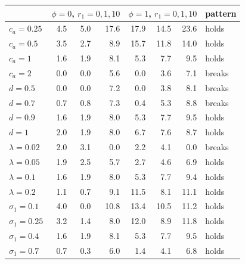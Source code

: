 \begin{tabular}{lrrrrrrl}
\toprule
& \multicolumn{3}{c}{$\phi=0$, $r_1=0,1,10$} & \multicolumn{3}{c}{$\phi=1$, $r_1=0,1,10$} & pattern \\
\midrule
$c_a=0.25$ & 4.5 & 5.0 & 17.6 & 17.9 & 14.5 & 23.6 & holds \\
$c_a=0.5$ & 3.5 & 2.7 & 8.9 & 15.7 & 11.8 & 14.0 & holds \\
$c_a=1$ & 1.6 & 1.9 & 8.1 & 5.3 & 7.7 & 9.5 & holds \\
$c_a=2$ & 0.0 & 0.0 & 5.6 & 0.0 & 3.6 & 7.1 & breaks \\
$d=0.5$ & 0.0 & 0.0 & 7.2 & 0.0 & 3.8 & 8.1 & breaks \\
$d=0.7$ & 0.7 & 0.8 & 7.3 & 0.4 & 5.3 & 8.8 & breaks \\
$d=0.9$ & 1.6 & 1.9 & 8.0 & 5.3 & 7.7 & 9.5 & holds \\
$d=1$ & 2.0 & 1.9 & 8.0 & 6.7 & 7.6 & 8.7 & holds \\
$\lambda=0.02$ & 2.0 & 3.1 & 0.0 & 2.2 & 4.1 & 0.0 & breaks \\
$\lambda=0.05$ & 1.9 & 2.5 & 5.7 & 2.7 & 4.6 & 6.9 & holds \\
$\lambda=0.1$ & 1.6 & 1.9 & 8.0 & 5.3 & 7.7 & 9.4 & holds \\
$\lambda=0.2$ & 1.1 & 0.7 & 9.1 & 11.5 & 8.1 & 11.1 & holds \\
$\sigma_1=0.1$ & 4.0 & 0.0 & 10.8 & 13.4 & 10.5 & 11.2 & holds \\
$\sigma_1=0.25$ & 3.2 & 1.4 & 8.0 & 12.0 & 8.9 & 11.8 & holds \\
$\sigma_1=0.4$ & 1.6 & 1.9 & 8.1 & 5.3 & 7.7 & 9.5 & holds \\
$\sigma_1=0.7$ & 0.7 & 0.3 & 6.0 & 1.4 & 4.1 & 6.8 & holds \\
\bottomrule
\end{tabular}
